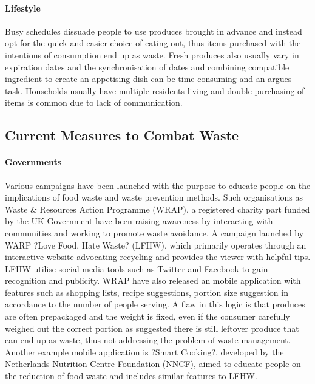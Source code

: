 \documentclass[a4paper, 11pt]{article}
\begin{document}
\paragraph{Lifestyle} Busy schedules dissuade people to use produces brought in advance and instead opt for the quick and easier choice of eating out, thus items purchased with the intentions of consumption end up as waste. Fresh produces also usually vary in expiration dates and the synchronisation of dates and combining compatible ingredient to create an appetising dish can be time-consuming and an argues task. Households usually have multiple residents living and double purchasing of items is common due to lack of communication. 

\vspace{\baselineskip}
\vspace{\baselineskip}
\vspace{\baselineskip}

\subsection{Current Measures to Combat Waste}

\paragraph{Governments} Various campaigns have been launched with the purpose to educate people on the implications of food waste and waste prevention methods. Such organisations as Waste \& Resources Action Programme (WRAP), a registered charity part funded by the UK Government have been raising awareness by interacting with communities and working to promote waste avoidance. A campaign launched by WARP ?Love Food, Hate Waste? (LFHW), which primarily operates through an interactive website advocating recycling and provides the viewer with helpful tips. LFHW utilise social media tools such as Twitter and Facebook to gain recognition and publicity. WRAP have also released an mobile application with features such as shopping lists, recipe suggestions, portion size suggestion in accordance to the number of people serving. A flaw in this logic is that produces are often prepackaged and the weight is fixed, even if the consumer carefully weighed out the correct portion as suggested there is still leftover produce that can end up as waste, thus not addressing the problem of waste management. Another example mobile application is ?Smart Cooking?, developed by the Netherlands Nutrition Centre Foundation (NNCF), aimed to educate people on the reduction of food waste and includes similar features to LFHW.
\end{document}
